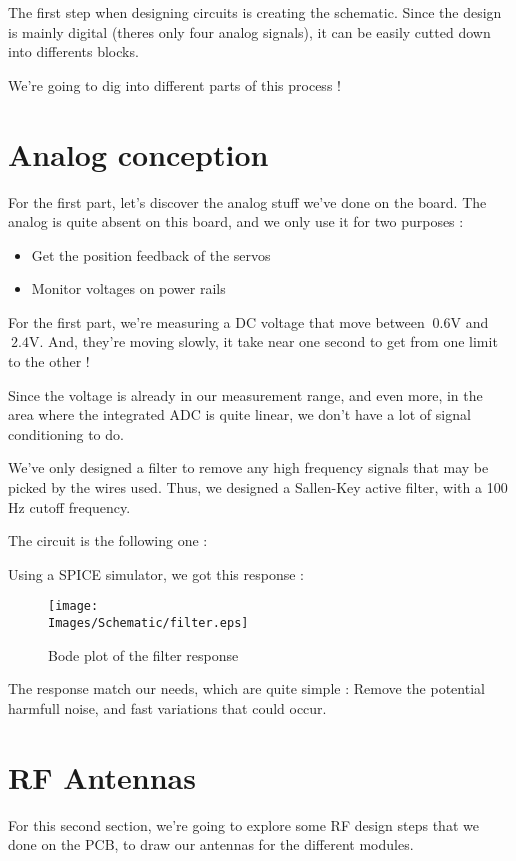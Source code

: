 The first step when designing circuits is creating the schematic.
Since the design is mainly digital (theres only four analog signals), it 
can be easily cutted down into differents blocks.

We're going to dig into different parts of this process !

\section{Analog conception}
For the first part, let's discover the analog stuff we've done on the board.
The analog is quite absent on this board, and we only use it for two purposes :
\begin{itemize}
    \item   Get the position feedback of the servos
    \item   Monitor voltages on power rails
\end{itemize}

For the first part, we're measuring a DC voltage that move between $~0.6 \si{\volt}$
and $~2.4 \si{\volt}$. And, they're moving slowly, it take near one second to get
from one limit to the other !

Since the voltage is already in our measurement range, and even more, in the area
where the integrated ADC is quite linear, we don't have a lot of signal conditioning 
to do.

We've only designed a filter to remove any high frequency signals that may be picked
by the wires used. Thus, we designed a Sallen-Key active filter, with a 100 Hz cutoff
frequency.

The circuit is the following one :


Using a SPICE simulator, we got this response : 
\begin{figure}[!hbt]
    \centering
    \texttt{[image: \\Images/Schematic/filter.eps]}
    \caption{Bode plot of the filter response}
\end{figure}
\FloatBarrier

The response match our needs, which are quite simple : Remove the potential harmfull noise, 
and fast variations that could occur.

\section{RF Antennas}
For this second section, we're going to explore some RF design steps that we done on the PCB, 
to draw our antennas for the different modules.

